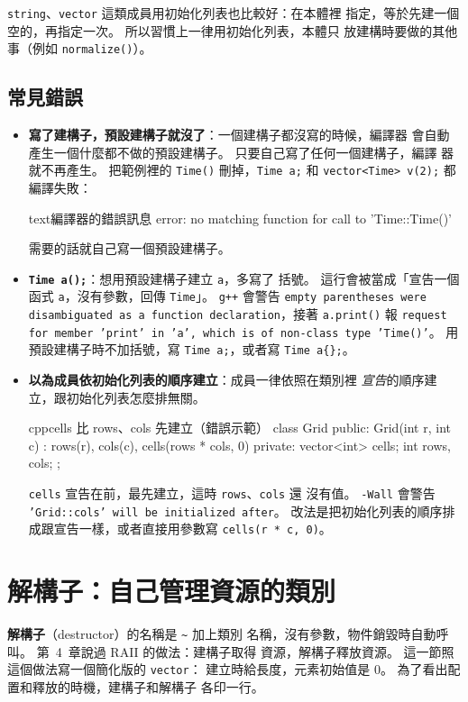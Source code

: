 \texttt{string}、\texttt{vector} 這類成員用初始化列表也比較好：在本體裡
指定，等於先建一個空的，再指定一次。 所以習慣上一律用初始化列表，本體只
放建構時要做的其他事（例如 \texttt{normalize()}）。

\subsection{常見錯誤}

\begin{itemize}
\item \textbf{寫了建構子，預設建構子就沒了}：一個建構子都沒寫的時候，編譯器
會自動產生一個什麼都不做的預設建構子。 只要自己寫了任何一個建構子，編譯
器就不再產生。 把範例裡的 \texttt{Time()} 刪掉，\texttt{Time a;} 和
\texttt{vector<Time> v(2);} 都編譯失敗：
\begin{code}{text}{編譯器的錯誤訊息}
error: no matching function for call to 'Time::Time()'
\end{code}
需要的話就自己寫一個預設建構子。
\item \textbf{\texttt{Time a();}}：想用預設建構子建立 \texttt{a}，多寫了
括號。 這行會被當成「宣告一個函式 \texttt{a}，沒有參數，回傳
\texttt{Time}」。 \texttt{g++} 會警告 \texttt{empty parentheses were
disambiguated as a function declaration}，接著 \texttt{a.print()} 報
\texttt{request for member 'print' in 'a', which is of non-class type
'Time()'}。 用預設建構子時不加括號，寫 \texttt{Time a;}，或者寫
\texttt{Time a\{\};}。
\item \textbf{以為成員依初始化列表的順序建立}：成員一律依照在類別裡
\emph{宣告}的順序建立，跟初始化列表怎麼排無關。
\begin{code}{cpp}{cells 比 rows、cols 先建立（錯誤示範）}
class Grid {
public:
    Grid(int r, int c) : rows(r), cols(c), cells(rows * cols, 0) {}
private:
    vector<int> cells;
    int rows, cols;
};
\end{code}
\texttt{cells} 宣告在前，最先建立，這時 \texttt{rows}、\texttt{cols} 還
沒有值。 \texttt{-Wall} 會警告 \texttt{'Grid::cols' will be initialized
after}。 改法是把初始化列表的順序排成跟宣告一樣，或者直接用參數寫
\texttt{cells(r * c, 0)}。
\end{itemize}

\section{解構子：自己管理資源的類別}
\label{sec:dtor}

\textbf{解構子}（destructor）的名稱是 \texttt{\textasciitilde} 加上類別
名稱，沒有參數，物件銷毀時自動呼叫。 第~4~章說過 RAII 的做法：建構子取得
資源，解構子釋放資源。 這一節照這個做法寫一個簡化版的 \texttt{vector}：
建立時給長度，元素初始值是 $0$。 為了看出配置和釋放的時機，建構子和解構子
各印一行。


